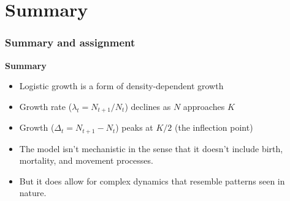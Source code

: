 \documentclass[color=usenames,dvipsnames]{beamer}\usepackage[]{graphicx}\usepackage[]{color}
\begin{document}
\section{Summary}







\begin{frame}
  \frametitle{Summary and assignment}
  \large
  {\bf Summary}
  \begin{itemize}[<+->]
    \item Logistic growth is a form of density-dependent growth
    \item Growth rate ($\lambda_t=N_{t+1}/N_t$) declines as $N$ approaches $K$
    \item Growth ($\Delta_t=N_{t+1}-N_t$) peaks at $K/2$ (the
      inflection point)
    \item The model isn't mechanistic in the sense that it doesn't
      include birth, mortality, and movement processes. 
    \item But it does allow for complex dynamics that resemble
      patterns seen in nature.
  \end{itemize}
  \vfill
\end{frame}
\end{document}
